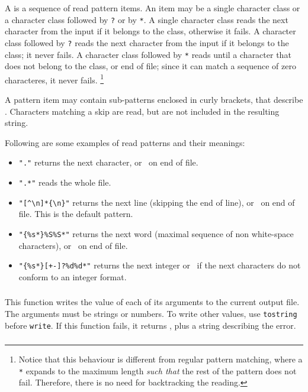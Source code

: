 A  is a sequence of read pattern items.
An item may be a single character class
or a character class followed by \verb'?' or by \verb'*'.
A single character class reads the next character from the input
if it belongs to the class, otherwise it fails.
A character class followed by \verb'?' reads the next character
from the input if it belongs to the class;
it never fails.
A character class followed by \verb'*' reads until a character that
does not belong to the class, or end of file;
since it can match a sequence of zero characteres, it never fails.%
\footnote{
Notice that this behaviour is different from regular pattern matching,
where a \verb'*' expands to the maximum length {\em such that\/}
the rest of the pattern does not fail.
Therefore, there is no need for backtracking the reading.
}

A pattern item may contain sub-patterns enclosed in curly brackets,
that describe .
Characters matching a skip are read,
but are not included in the resulting string.

Following are some examples of read patterns and their meanings:
\begin{itemize}
\item \verb|"."| returns the next character, or \nil\ on end of file.
\item \verb|".*"| reads the whole file.
\item \verb|"[^\n]*{\n}"| returns the next line
(skipping the end of line), or \nil\ on end of file.
This is the default pattern.
\item \verb|"{%s*}%S%S*"| returns the next word
(maximal sequence of non white-space characters),
or \nil\ on end of file.
\item \verb|"{%s*}[+-]?%d%d*"| returns the next integer
or \nil\ if the next characters do not conform to an integer format.
\end{itemize}

\subsubsection*{}

This function writes the value of each of its arguments to the
current output file.
The arguments must be strings or numbers.
To write other values,
use \verb|tostring| before \verb|write|.
If this function fails, it returns \nil,
plus a string describing the error.

\subsubsection*{}

